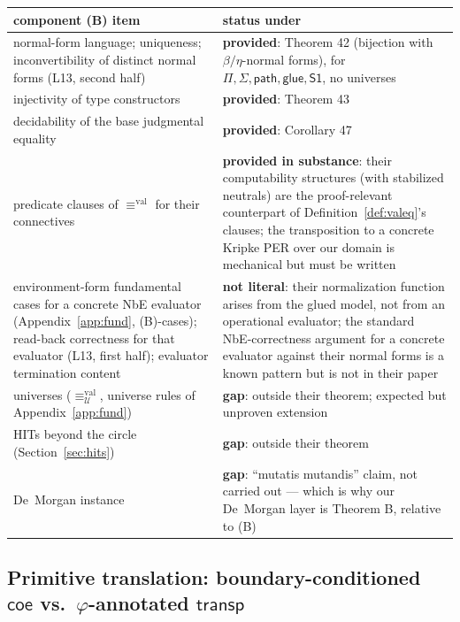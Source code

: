 \documentclass{lmcs}
\newcommand{\transp}{\mathsf{transp}}
\newcommand{\valeq}{\equiv^{\mathrm{val}}}
\newcommand{\U}{\mathcal{U}}
\begin{document}
\begin{center}
\begin{tabular}{p{}p{}}
  component (B) item & status under \cite{SterlingAngiuli} \\\hline
  normal-form language; uniqueness; inconvertibility of distinct
  normal forms (L13, second half) &
  \textbf{provided}: Theorem 42 (bijection with $\beta/\eta$-normal
  forms), for $\Pi, \Sigma, \mathsf{path}, \mathsf{glue},
  \mathsf{S1}$, no universes \\
  injectivity of type constructors &
  \textbf{provided}: Theorem 43 \\
  decidability of the base judgmental equality &
  \textbf{provided}: Corollary 47 \\
  predicate clauses of $\valeq$ for their connectives &
  \textbf{provided in substance}: their computability structures
  (with stabilized neutrals) are the proof-relevant counterpart of
  Definition~\ref{def:valeq}'s clauses; the transposition to a
  concrete Kripke PER over our domain is mechanical but must be
  written \\
  environment-form fundamental cases for a concrete NbE evaluator
  (Appendix~\ref{app:fund}, (B)-cases); read-back correctness for
  that evaluator (L13, first half); evaluator termination content &
  \textbf{not literal}: their normalization function arises from the
  glued model, not from an operational evaluator; the standard
  NbE-correctness argument for a concrete evaluator against their
  normal forms is a known pattern but is not in their paper \\
  universes ($\valeq_\U$, universe rules of
  Appendix~\ref{app:fund}) & \textbf{gap}: outside their theorem;
  expected but unproven extension \\
  HITs beyond the circle (Section~\ref{sec:hits}) &
  \textbf{gap}: outside their theorem \\
  De~Morgan instance & \textbf{gap}: ``mutatis mutandis'' claim, not
  carried out --- which is why our De~Morgan layer is Theorem B,
  relative to (B) \\
\end{tabular}
\end{center}

\subsection{Primitive translation: boundary-conditioned
  $\mathsf{coe}$ vs.\ $\varphi$-annotated $\transp$}
\end{document}
